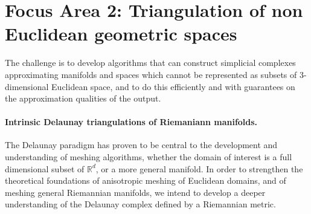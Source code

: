 %

\newcommand{\man}{\mathcal{M}}
\newcommand{\reel}{\mathbb{R}}
\newcommand{\rdee}{\reel^d}
\renewcommand{\pts}{P}
\newcommand{\mesh}{\hat{M}}

\newcommand{\ramsay}[1]{\framebox{#1}}%

\section*{Focus Area 2: Triangulation of non Euclidean geometric spaces}

The challenge is to develop algorithms that can construct simplicial
complexes approximating manifolds and spaces which cannot be
represented as subsets of 3-dimensional Euclidean space, and to do
this efficiently and with guarantees on the approximation qualities of
the output. %

\paragraph{Intrinsic Delaunay triangulations of Riemaniann manifolds.}

The Delaunay paradigm has proven to be central to the development and
understanding of meshing algorithms, whether the domain of interest is
a full dimensional subset of $\rdee$, or a more general manifold. In
order to strengthen the theoretical foundations of anisotropic meshing of
Euclidean domains, and of meshing general Riemannian manifolds, we
intend to develop a deeper understanding of the
Delaunay complex defined by a Riemannian metric.
%


